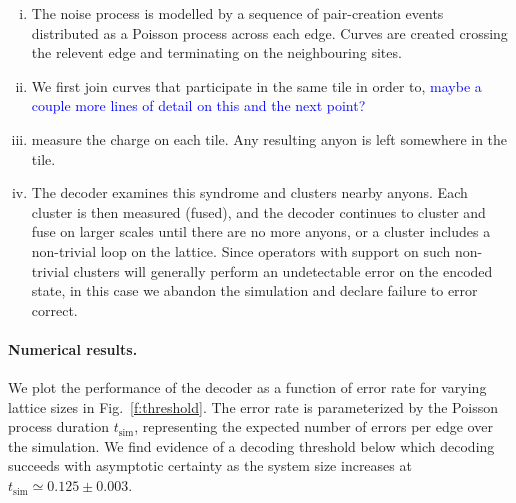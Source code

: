 \documentclass[aps, prl, letterpaper, twocolumn, superscriptaddress, notitlepage, 10pt]{revtex4-1}
\newcommand{\Fref}[1]{Fig.~\ref{#1}}
\newcommand{\cggb}[1]{\textcolor{blue}{#1}}
\begin{document}
\begin{enumerate}[i)]
	\item The noise process is modelled by a sequence of pair-creation events distributed as 
	a Poisson process across each edge. Curves are created crossing the relevent edge 
	and terminating on the neighbouring sites.
	\item We first join curves that participate in the same tile in order to, 
	\cggb{maybe a couple more lines of detail on this and the next point?}
	\item measure the charge on each tile. Any resulting anyon is left somewhere in the tile.
	\item The decoder examines this syndrome and clusters nearby anyons. Each cluster 
	is then measured (fused), and the decoder continues to cluster and fuse on larger 
	scales until there are no more anyons, or a cluster includes a non-trivial loop on the 
	lattice. Since operators with support on such non-trivial clusters will generally perform an 
	undetectable error on the encoded state, in this case we abandon the simulation and 
	declare failure to error correct.
\end{enumerate}

\paragraph{Numerical results.}

We plot the performance of the decoder as a function of error rate for varying lattice sizes in 
\Fref{f:threshold}. The error rate is parameterized by the Poisson process duration 
$t_{\mathrm{sim}}$, representing the expected number of errors per edge over the simulation. 
We find evidence of a decoding threshold below which decoding succeeds with asymptotic 
certainty as the system size increases at $t_{\mathrm{sim}}\simeq 0.125 \pm 0.003$.
\end{document}

